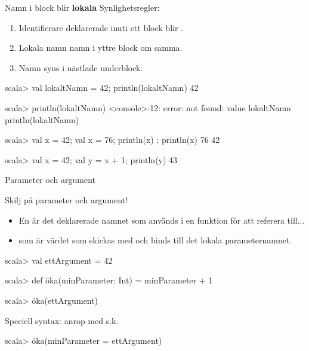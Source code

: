 \begin{Slide}{Namn i block blir \textbf{lokala}}
Synlighetsregler: 
\begin{enumerate}
\item Identifierare deklarerade inuti ett block blir .

\item Lokala namn  namn i yttre block om samma.


\item Namn syns i nästlade underblock.

\end{enumerate}

\begin{REPL}
scala> { val lokaltNamn = 42; println(lokaltNamn) }
42

scala> println(lokaltNamn)
<console>:12: error: not found: value lokaltNamn
       println(lokaltNamn)

scala> { val x = 42; { val x = 76; println(x) }; println(x) }
76
42

scala> { val x = 42; { val y = x + 1; println(y) } }
43
\end{REPL}

\end{Slide}


\begin{Slide}{Parameter och argument}

Skilj på parameter och argument!
\begin{itemize}
\item En  är det deklarerade namnet som används  i en funktion för att referera till...

\item {} som är värdet som skickas med  och binds till det lokala parameternamnet.

\end{itemize}


\begin{REPLnonum}
scala> val ettArgument = 42

scala> def öka(minParameter: Int) = minParameter + 1

scala> öka(ettArgument)
\end{REPLnonum}


Speciell syntax: anrop med s.k. 
\begin{REPLnonum}
scala> öka(minParameter = ettArgument) 
\end{REPLnonum}

\end{Slide}

